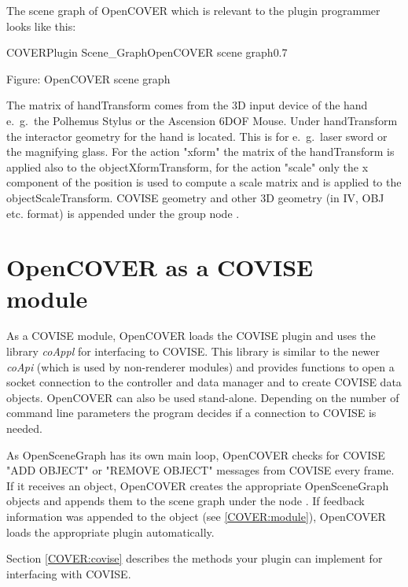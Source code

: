 The scene graph of OpenCOVER which is relevant to the plugin programmer looks like 
this:

\begin{covimg}{COVERPlugin}
     {Scene_Graph}{OpenCOVER scene graph}{0.7}\end{covimg}
\begin{htmlonly}
Figure: OpenCOVER scene graph
\end{htmlonly}
\vspace*{1cm}

The matrix of handTransform comes from the 3D input device of the hand e.~g.\ the 
Polhemus Stylus or the Ascension 6DOF Mouse. Under handTransform the interactor 
geometry for the hand is located. This is for e.~g.\ laser sword or the 
magnifying glass. For the action "xform" the matrix of the handTransform is applied 
also to the objectXformTransform, for the action "scale" only the x component of the 
position is used to compute a scale matrix and is applied to the objectScaleTransform. 
COVISE geometry and other 3D geometry (in IV, OBJ etc. format) is appended 
under the group node .


\section{OpenCOVER as a COVISE module}
\latexonly
{}
\endlatexonly

As a COVISE module, OpenCOVER loads the COVISE plugin and uses the library \emph{coAppl} for interfacing to COVISE. 
This library is similar to the newer \emph{coApi} (which is
used by non-renderer modules) and provides functions to open a socket connection 
to the controller and data manager and to create COVISE data objects. OpenCOVER can 
also be used stand-alone. Depending on the number of command line parameters the program 
decides if a connection to COVISE is needed. 

As OpenSceneGraph has its own main loop, OpenCOVER checks for COVISE "ADD OBJECT" 
or "REMOVE OBJECT" messages from COVISE every frame. If it receives an object,
OpenCOVER creates the appropriate OpenSceneGraph objects and appends them to the scene 
graph under the node . If feedback information was
appended to the object (see \ref{COVER:module}), OpenCOVER loads the appropriate
plugin automatically.

Section \ref{COVER:covise} describes the methods your plugin can implement for
interfacing with COVISE.


